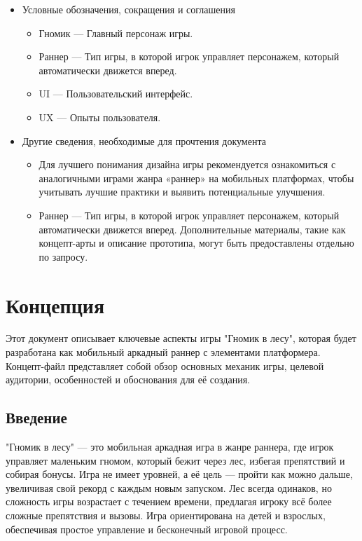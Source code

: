 \documentclass{article}
\begin{document}
\begin{itemize}
\item Условные обозначения, сокращения и соглашения
	\begin{itemize}
            \item Гномик — Главный персонаж игры.
            \item Раннер — Тип игры, в которой игрок управляет персонажем, который автоматически движется вперед.
            \item UI — Пользовательский интерфейс.
            \item UX — Опыты пользователя.
	\end{itemize}

\item Другие сведения, необходимые для прочтения документа
	\begin{itemize}
            \item Для лучшего понимания дизайна игры рекомендуется ознакомиться с аналогичными играми жанра «раннер» на мобильных платформах, чтобы учитывать лучшие практики и выявить потенциальные улучшения.
            \item Раннер — Тип игры, в которой игрок управляет персонажем, который автоматически движется вперед.
            Дополнительные материалы, такие как концепт-арты и описание прототипа, могут быть предоставлены отдельно по запросу.
	\end{itemize}
\end{itemize}

\section{Концепция}

Этот документ описывает ключевые аспекты игры "Гномик в лесу", которая будет разработана как мобильный аркадный раннер с элементами платформера. Концепт-файл представляет собой обзор основных механик игры, целевой аудитории, особенностей и обоснования для её создания.

\subsection{Введение}

"Гномик в лесу" — это мобильная аркадная игра в жанре раннера, где игрок управляет маленьким гномом, который бежит через лес, избегая препятствий и собирая бонусы. Игра не имеет уровней, а её цель — пройти как можно дальше, увеличивая свой рекорд с каждым новым запуском. Лес всегда одинаков, но сложность игры возрастает с течением времени, предлагая игроку всё более сложные препятствия и вызовы. Игра ориентирована на детей и взрослых, обеспечивая простое управление и бесконечный игровой процесс.
\end{document}

